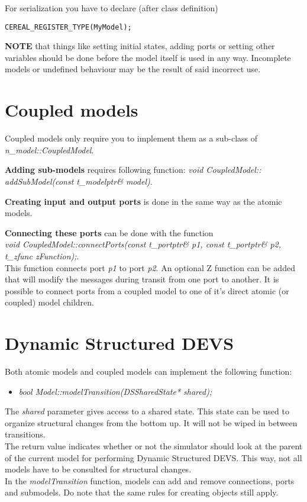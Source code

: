 For serialization you have to declare (after class definition)
\begin{verbatim}
CEREAL_REGISTER_TYPE(MyModel);
\end{verbatim}

\textbf{NOTE} that things like setting initial states, adding ports or setting other variables should be done before the model itself is used in any way. Incomplete models or undefined behaviour may be the result of said incorrect use.

\section{Coupled models}
Coupled models only require you to implement them as a sub-class of \\ \textsl{n\_model::CoupledModel}.

\textbf{Adding sub-models} requires following function: \textsl{void CoupledModel:: \\addSubModel(const t\_modelptr\& model)}.

\textbf{Creating input and output ports} is done in the same way as the atomic models.

\textbf{Connecting these ports} can be done with the function\\ \textsl{void CoupledModel::connectPorts(const t\_portptr\& p1, const t\_portptr\& p2, t\_zfunc zFunction);}.\\ This function connects port \textsl{p1} to port \textsl{p2}. An optional Z function can be added that will modify the messages during transit from one port to another.
It is possible to connect ports from a coupled model to one of it's direct atomic (or coupled) model children.

\section{Dynamic Structured DEVS}
Both atomic models and coupled models can implement the following function:
\begin{itemize}
	\item \textsl{bool Model::modelTransition(DSSharedState* shared);}
\end{itemize}
The \textsl{shared} parameter gives access to a shared state. This state can be used to organize structural changes from the bottom up. It will not be wiped in between transitions.\\
The return value indicates whether or not the simulator should look at the parent of the current model for performing Dynamic Structured DEVS. This way, not all models have to be consulted for structural changes.\\
In the \textsl{modelTransition} function, models can add and remove connections, ports and submodels. Do note that the same rules for creating objects still apply.
